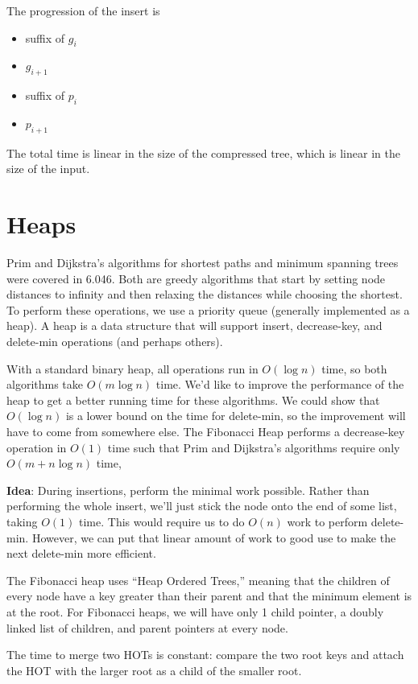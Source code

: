 \documentclass{article}
\begin{document}
The progression of the insert is\\ \begin{itemize}
\item suffix of $g_i$ 
\item $g_{i+1}$ 
\item suffix of $p_i$ 
\item $p_{i+1}$
\end{itemize}

The total time is linear in the size of the compressed tree, which is
linear in the size of the input.


\section{Heaps}

Prim and Dijkstra's algorithms for shortest paths and minimum spanning
trees were covered in 6.046.  Both are greedy algorithms that start by
setting node distances to infinity and then relaxing the distances while
choosing the shortest.  To perform these operations, we use a priority
queue (generally implemented as a heap).  A heap is a data structure
that will support insert, decrease-key, and delete-min operations (and
perhaps others).

With a standard binary heap, all operations run in $O(\log n)$ time, so
both algorithms take $O(m \log n)$ time.  We'd like to improve the
performance of the heap to get a better running time for these
algorithms.  We could show that $O(\log n)$ is a lower bound on the time
for delete-min, so the improvement will have to come from somewhere
else.  The Fibonacci Heap performs a decrease-key operation in $O(1)$
time such that Prim and Dijkstra's algorithms require only $O(m + n \log
n)$ time,

\textbf{Idea}: During insertions, perform the minimal work possible.
Rather than performing the whole insert, we'll just stick the node
onto the end of some list, taking $O(1)$ time.  This would require us
to do $O(n)$ work to perform delete-min.  However, we can put that
linear amount of work to good use to make the next delete-min more
efficient.

The Fibonacci heap uses ``Heap Ordered Trees,'' meaning that the
children of every node have a key greater than their parent and that
the minimum element is at the root.  For Fibonacci heaps, we will have
only 1 child pointer, a doubly linked list of children, and parent
pointers at every node.

The time to merge two HOTs is constant: compare the two root
keys and attach the HOT with the larger root as a child of the smaller
root.  
\end{document}
